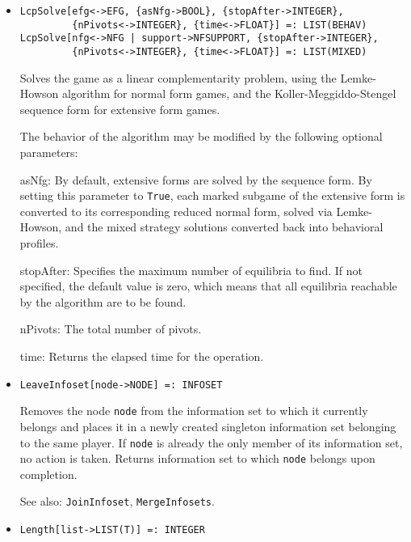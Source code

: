 \begin{itemize}
\item
\protect \large \begin{verbatim}
LcpSolve[efg<->EFG, {asNfg->BOOL}, {stopAfter->INTEGER},
         {nPivots<->INTEGER}, {time<->FLOAT}] =: LIST(BEHAV)
LcpSolve[nfg<->NFG | support->NFSUPPORT, {stopAfter->INTEGER},
         {nPivots<->INTEGER}, {time<->FLOAT}] =: LIST(MIXED)
\end{verbatim}\normalsize

\bd
Solves the game as a linear complementarity problem, using the
Lemke-Howson algorithm for normal form games, and the
Koller-Meggiddo-Stengel sequence form for extensive form games.  


The behavior of the algorithm may be modified by the following
optional parameters:
\bd
\item
[asNfg:] By default, extensive forms are solved by the sequence form.
By setting this parameter to \verb+True+, each marked subgame of the extensive
form is converted to its corresponding reduced normal form, solved
via Lemke-Howson, and the mixed strategy solutions converted back into
behavioral profiles.
\item
[stopAfter:] Specifies the maximum number of equilibria to find.  If
not specified, the default value is zero, which means that all
equilibria reachable by the algorithm are to be found.
\item
[nPivots:] The total number of pivots. 
\item
[time:] Returns the elapsed time for the operation.
\ed
\ed

\item
\protect \large \begin{verbatim}
LeaveInfoset[node->NODE] =: INFOSET
\end{verbatim}\normalsize

\bd
Removes the node \verb+node+ from the information set to
which it currently belongs and places it in a newly created
singleton information set belonging to the same player.  If \verb+node+
is already the only member of its information set, no action is taken.
Returns information set to which \verb+node+ belongs upon completion.
\item
[See also:] {\tt JoinInfoset}, {\tt MergeInfosets}.
\ed

\item
\protect \large \begin{verbatim}
Length[list->LIST(T)] =: INTEGER
\end{verbatim}\normalsize


\end{itemize}
